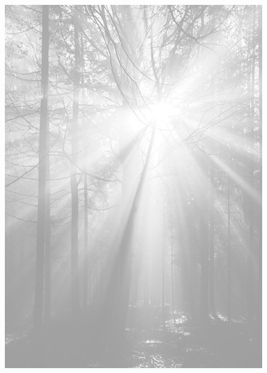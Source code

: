 \documentclass[ngerman,a4paper,11pt]{scrreprt}
\begin{document}
\begin{figure}[H]
\centering
\includegraphics[width=\textwidth,height=.8\textheight]{Bilder/Bilder/./750_0010_16157_1122849_Hintergrund_mit_Wald_und_Sonne_1.png}
\end{figure}
\end{document}
